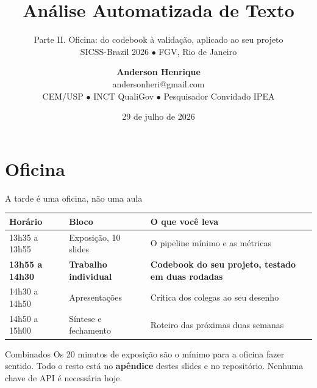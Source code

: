 \documentclass[11pt,aspectratio=169]{beamer}
\title[Análise Automatizada de Texto | Tarde]{Análise Automatizada de Texto}
\subtitle{Parte II. Oficina: do codebook à validação, aplicado ao seu projeto \\
\small SICSS-Brazil 2026 $\bullet$ FGV, Rio de Janeiro}
\author[Anderson Henrique]{\textbf{Anderson Henrique} \\ \small andersonheri@gmail.com \\
\small CEM/USP $\bullet$ INCT QualiGov $\bullet$ Pesquisador Convidado IPEA}
\institute[SICSS-Brazil]{Summer Institute in Computational Social Science, Brazil}
\date{29 de julho de 2026}
\begin{document}
\begin{frame}
  \titlepage
\end{frame}

\section{Oficina}

\begin{frame}{A tarde é uma oficina, não uma aula}
\begin{table}
\small
\begin{tabular}{p{2.1cm}p{4.9cm}p{5.6cm}}
\toprule
\textbf{Horário} & \textbf{Bloco} & \textbf{O que você leva} \\
\midrule
13h35 a 13h55 & Exposição, 10 slides & O pipeline mínimo e as métricas \\
\textbf{13h55 a 14h30} & \textbf{Trabalho individual} &
\textbf{Codebook do seu projeto, testado em duas rodadas} \\
14h30 a 14h50 & Apresentações & Crítica dos colegas ao seu desenho \\
14h50 a 15h00 & Síntese e fechamento & Roteiro das próximas duas semanas \\
\bottomrule
\end{tabular}
\end{table}
\vspace{0.1cm}
\begin{alertblock}{Combinados}
\footnotesize
Os 20 minutos de exposição são o mínimo para a oficina fazer sentido. Todo o
resto está no \textbf{apêndice} destes slides e no repositório. Nenhuma chave de
API é necessária hoje.
\end{alertblock}
\end{frame}
\end{document}
